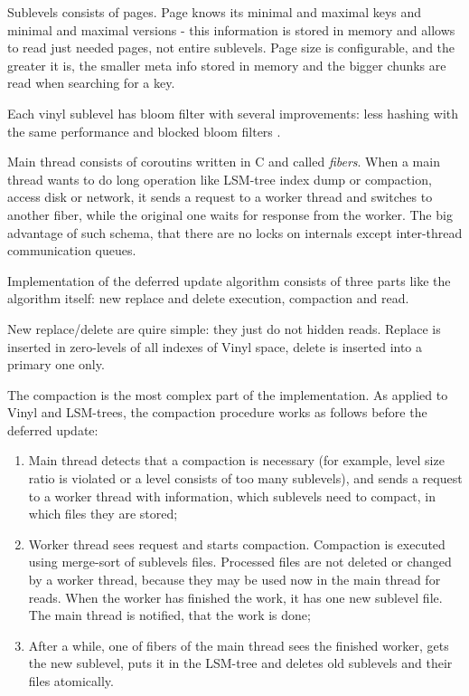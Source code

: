 \documentclass{vldb}
\begin{document}
Sublevels consists of pages. Page knows its minimal and maximal keys and minimal
and maximal versions - this information is stored in memory and allows to
read just needed pages, not entire sublevels. Page size is configurable, and the
greater it is, the smaller meta info stored in memory and the bigger chunks are
read when searching for a key.

Each vinyl sublevel has bloom filter with several improvements: less hashing
with the same performance \cite{Kirsch:bloom_less_hashing} and blocked bloom
filters \cite{Putze:bloom_cache_oblivious}.

Main thread consists of coroutins written in C and called \textit{fibers}. When
a main thread wants to do long operation like LSM-tree index dump or compaction,
access disk or network, it sends a request to a worker thread and switches to
another fiber, while the original one waits for response from the worker. The
big advantage of such schema, that there are no locks on internals except
inter-thread communication queues.

Implementation of the deferred update algorithm consists of three parts like the
algorithm itself: new replace and delete execution, compaction and read.

New replace/delete are quire simple: they just do not hidden reads. Replace is
inserted in zero-levels of all indexes of Vinyl space, delete is inserted into a
primary one only.

The compaction is the most complex part of the implementation. As applied to
Vinyl and LSM-trees, the compaction procedure works as follows before the
deferred update:
\begin{enumerate}
\item Main thread detects that a compaction is necessary (for example, level
size ratio is violated or a level consists of too many sublevels), and sends a
request to a worker thread with information, which sublevels need to compact, in
which files they are stored;
\item Worker thread sees request and starts compaction. Compaction is executed
using merge-sort of sublevels files. Processed files are not deleted or changed
by a worker thread, because they may be used now in the main thread for reads.
When the worker has finished the work, it has one new sublevel file. The main
thread is notified, that the work is done;
\item After a while, one of fibers of the main thread sees the finished worker,
gets the new sublevel, puts it in the LSM-tree and deletes old sublevels and
their files atomically.
\end{enumerate}
\end{document}
